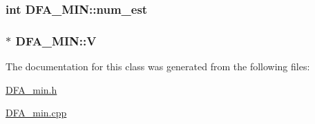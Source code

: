 \subsubsection[{\texorpdfstring{num\+\_\+est}{num_est}}]{\setlength{\rightskip}{0pt plus 5cm}int D\+F\+A\+\_\+\+M\+I\+N\+::num\+\_\+est\hspace{0.3cm}{\ttfamily [private]}}\hypertarget{classDFA__MIN_afdb3a42ec5ff49939f83da7d524ecad4}{}\label{classDFA__MIN_afdb3a42ec5ff49939f83da7d524ecad4}
\subsubsection[{\texorpdfstring{V}{V}}]{$\ast$ D\+F\+A\+\_\+\+M\+I\+N\+::V\hspace{0.3cm}{\ttfamily [private]}}\hypertarget{classDFA__MIN_a63e88c71f42528401f723e7b0a1546b7}{}\label{classDFA__MIN_a63e88c71f42528401f723e7b0a1546b7}


The documentation for this class was generated from the following files\+:\begin{DoxyCompactItemize}
\item 
\hyperlink{DFA__min_8h}{D\+F\+A\+\_\+min.\+h}\item 
\hyperlink{DFA__min_8cpp}{D\+F\+A\+\_\+min.\+cpp}\end{DoxyCompactItemize}
